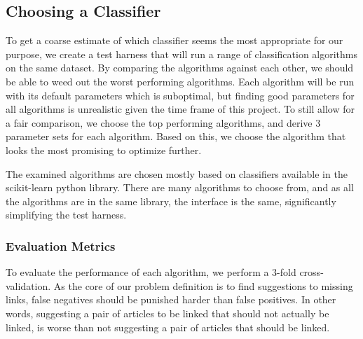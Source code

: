 
\subsection{Choosing a Classifier}\label{choosing_classifier}
To get a coarse estimate of which classifier seems the most appropriate for our purpose, we create a test harness that will run a range of classification algorithms on the same dataset. By comparing the algorithms against each other, we should be able to weed out the worst performing algorithms. Each algorithm will be run with its default parameters which is suboptimal, but finding good parameters for all algorithms is unrealistic given the time frame of this project. To still allow for a fair comparison, we choose the top performing algorithms, and derive 3 parameter sets for each algorithm. Based on this, we choose the algorithm that looks the most promising to optimize further.

The examined algorithms are chosen mostly based on classifiers available in the scikit-learn python library. There are many algorithms to choose from, and as all the algorithms are in the same library, the interface is the same, significantly simplifying the test harness.

\subsubsection{Evaluation Metrics}
To evaluate the performance of each algorithm, we perform a 3-fold cross-validation. As the core of our problem definition is to find suggestions to missing links, false negatives should be punished harder than false positives. In other words, suggesting a pair of articles to be linked that should not actually be linked, is worse than not suggesting a pair of articles that should be linked. 

